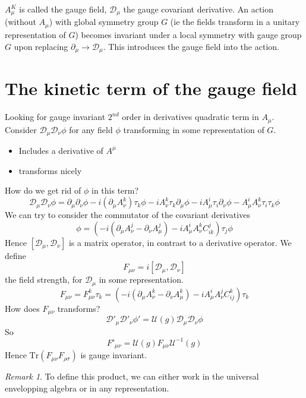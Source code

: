 \documentclass[a4paper]{book}
\theoremstyle{definition}
\theoremstyle{remark}
\newtheorem*{remark}{Remark}
\begin{document}
$A^K_\mu$ is called the gauge field, $\mathcal D_\mu$ the gauge covariant derivative. An action (without $A_\mu$) with global symmetry group $G$ (ie the fields transform in a unitary representation of $G$) becomes invariant under a local symmetry with gauge group $G$ upon replacing $\partial_\mu \rightarrow \mathcal D_\mu$. This introduces the gauge field into the action. 

\section{The kinetic term of the gauge field}

Looking for gauge invariant $2^{nd}$ order in derivatives quadratic term in $A_\mu$. Consider $\mathcal D_\mu \mathcal D_\nu \phi$ for any field $\phi$ transforming in some representation of $G$. 
\begin{itemize}
    \item Includes a derivative of $A^\mu$
    \item transforms nicely 
\end{itemize}
How do we get rid of $\phi$ in this term?
\begin{equation}
    \mathcal D_\mu \mathcal D_\nu \phi = \partial_\mu \partial_\nu \phi  - i(\partial_\mu A^k_\nu)\tau_k \phi - i  A^k_\nu \tau_k \partial_\mu \phi - i A^i_\mu\tau_i \partial_\nu \phi - A^i_\mu A^k_\nu \tau_i \tau_k \phi
\end{equation}
We can try to consider the commutator of the covariant derivatives 
\begin{equation}
    [\mathcal D_\mu, \mathcal D_\nu]\phi = \left(-i (\partial_\mu A^j_\nu - \partial_\nu A^j_\mu) - iA^i_\mu A^k_\nu C^j_{ik}\right)\tau_j \phi
\end{equation}
Hence $[\mathcal D_\mu, \mathcal D_\nu]$ is a matrix operator, in contrast to a derivative operator. We define 
\begin{equation}
    F_{\mu\nu} = i[\mathcal D_\mu, \mathcal D_\nu] 
\end{equation}
the field strength, for $\mathcal D_\mu$ in some representation. 
\begin{equation}
    F_{\mu\nu} = F_{\mu\nu}^k \tau_k = \left(-i (\partial_\mu A^k_\nu - \partial_\nu A^k_\mu) - iA^i_\mu A^j_\nu C^k_{ij}\right)\tau_k
\end{equation}
How does $F_{\mu\nu}$ transforms? 
\begin{equation}
    \mathcal D'_\mu \mathcal D'_\nu \phi' = \mathcal U (g) \mathcal D_\mu \mathcal D_\nu \phi 
\end{equation}
So 
\begin{equation}
    F'_{\mu\nu} = \mathcal U (g) F_{\mu\nu} \mathcal U^{-1}(g)
\end{equation}
Hence $\text{Tr}(F_{\mu\nu}F_{\rho\sigma})$ is gauge invariant.
\begin{remark}
    To define this product, we can either work in the universal envelopping algebra or in any representation.
\end{remark}
\end{document}
